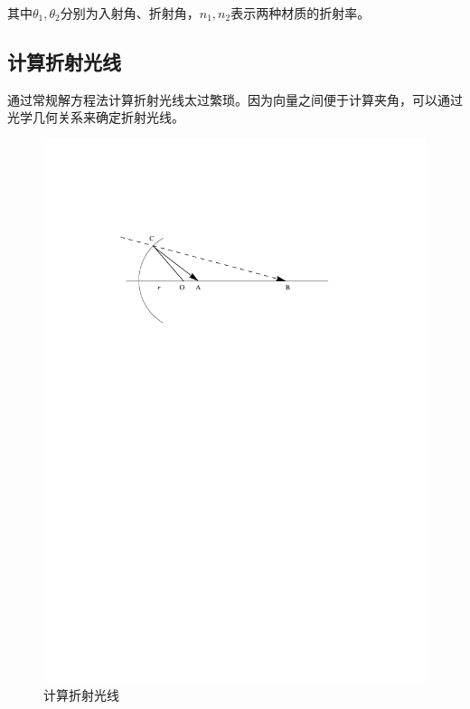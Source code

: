 \documentclass[10pt,twocolumn]{article}
\begin{document}
其中$\theta_1,\theta_2$分别为入射角、折射角，$n_1,n_2$表示两种材质的折射率。

\subsection{\hei 计算折射光线}
通过常规解方程法计算折射光线太过繁琐。因为向量之间便于计算夹角，可以通过光学几何关系来确定折射光线。

\begin{figure}[ht]
\centering
\includegraphics[scale=0.6]{fig10.pdf}
\caption{计算折射光线}
\end{figure}
\end{document}
